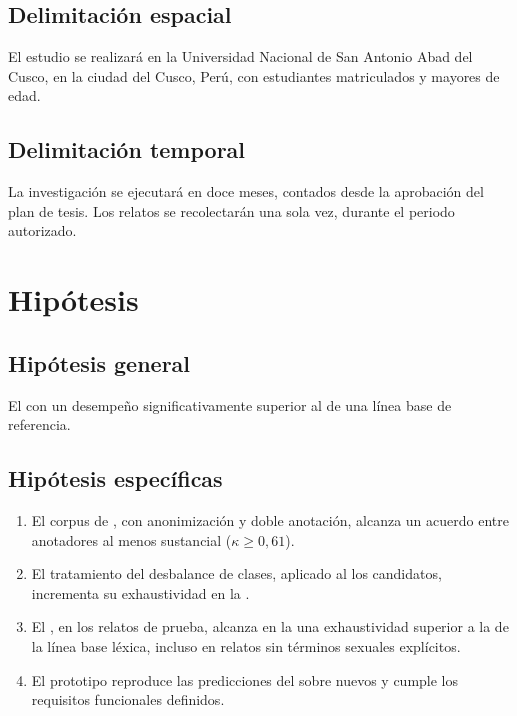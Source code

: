 \subsection{Delimitación espacial}
El estudio se realizará en la Universidad Nacional de San Antonio Abad del Cusco, en la ciudad del Cusco, Perú, con estudiantes matriculados y mayores de edad.

\subsection{Delimitación temporal}
La investigación se ejecutará en doce meses, contados desde la aprobación del plan de tesis. Los relatos se recolectarán una sola vez, durante el periodo autorizado.

\section{Hipótesis}

\subsection{Hipótesis general}
El    con un desempeño significativamente superior al de una línea base de referencia.

\subsection{Hipótesis específicas}
\begin{enumerate}[label=HE\arabic*:, leftmargin=1.6cm]
	\item El corpus de ,  con anonimización y doble anotación, alcanza un acuerdo entre anotadores al menos sustancial ($\kappa \geq 0{,}61$).
	\item El tratamiento del desbalance de clases, aplicado al  los  candidatos, incrementa su exhaustividad en la .
	\item El ,  en los relatos de prueba, alcanza en la  una exhaustividad superior a la de la línea base léxica, incluso en relatos sin términos sexuales explícitos.
	\item El prototipo  reproduce las predicciones del  sobre nuevos  y cumple los requisitos funcionales definidos.
\end{enumerate}

